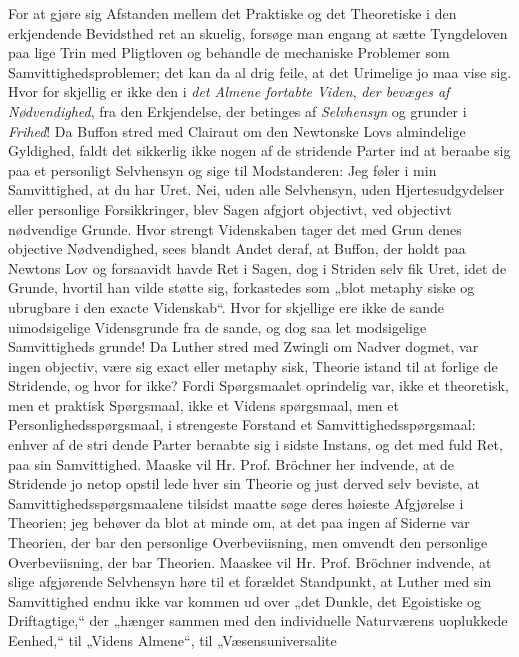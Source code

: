 \documentclass[12pt]{book}
\newcommand{\opage}[1]{\marginnote{\footnotesize\textit{[#1]}}}
\begin{document}
For at gjøre sig Afstanden mellem det Praktiske og
det Theoretiske i den erkjendende Bevidsthed ret an\-%
skuelig, forsøge man engang at sætte Tyngdeloven paa
lige Trin med Pligtloven og behandle de mechaniske
Problemer som Samvittighedsproblemer; det kan da al\-%
drig feile, at det Urimelige jo maa vise sig. Hvor for\-%
skjellig er ikke den i \emph{det Almene fortabte Viden},
\emph{der bevæges af Nødvendighed}, fra den Erkjendelse,
der betinges af \emph{Selvhensyn} og grunder i \emph{Frihed}!
Da Buffon stred med Clairaut om den Newtonske Lovs
almindelige Gyldighed, faldt det sikkerlig ikke nogen af
de stridende Parter ind at beraabe sig paa et personligt
Selvhensyn og sige til Modstanderen: Jeg føler i min
Samvittighed, at du har Uret. Nei, uden alle Selvhensyn,
uden Hjertesudgydelser eller personlige Forsikkringer,
blev Sagen afgjort objectivt, ved objectivt nødvendige
Grunde. Hvor strengt Videnskaben tager det med Grun\-%
denes objective Nødvendighed, sees blandt Andet deraf,
at Buffon, der holdt paa Newtons Lov og forsaavidt havde
Ret i Sagen, dog i Striden selv fik Uret, idet de Grunde,
hvortil han vilde støtte sig, forkastedes som „blot metaphy\-%
siske og ubrugbare i den exacte Videnskab“. Hvor for\-%
skjellige ere ikke de sande uimodsigelige Vidensgrunde
fra de sande, og dog saa let modsigelige Samvittigheds\-%
grunde! Da Luther stred med Zwingli om Nadver\-%
dogmet, var ingen objectiv, være sig exact eller metaphy\-%
sisk, Theorie istand til at forlige de Stridende, og hvor\-%
for ikke? Fordi Spørgsmaalet oprindelig var, ikke et
theoretisk, men et praktisk Spørgsmaal, ikke et Videns\-%
spørgsmaal, men et Personlighedsspørgsmaal, i strengeste
Forstand et Samvittighedsspørgsmaal: enhver af de stri\-%
dende Parter beraabte sig i sidste Instans, og det med
\opage{30}\setcounter{footnote}{0}%
fuld Ret, paa sin Samvittighed. Maaske vil Hr. Prof.
Bröchner her indvende, at de Stridende jo netop opstil\-%
lede hver sin Theorie og just derved selv beviste, at
Samvittighedsspørgsmaalene tilsidst maatte søge deres
høieste Afgjørelse i Theorien; jeg behøver da blot at
minde om, at det paa ingen af Siderne var Theorien,
der bar den personlige Overbeviisning, men omvendt den
personlige Overbeviisning, der bar Theorien. Maaskee
vil Hr. Prof. Bröchner indvende, at slige afgjørende
Selvhensyn høre til et forældet Standpunkt, at Luther
med sin Samvittighed endnu ikke var kommen ud over
„det Dunkle, det Egoistiske og Driftagtige,“ der „hænger
sammen med den individuelle Naturværens uoplukkede
Eenhed,“ til „Videns Almene“, til „Væsensuniversalite\-%
\end{document}
